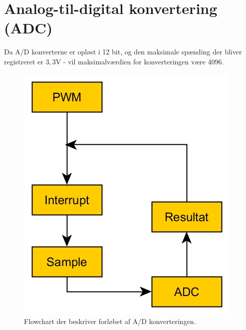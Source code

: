 \section{Analog-til-digital konvertering (ADC)}\label{sec:ADC}


Da A/D konverterne er opløst i 12 bit, og den maksimale spænding der bliver registreret er $3,3\si\volt$ - vil maksimalværdien for konverteringen være $4096$. 
\begin{figure}[h]
	\centering

		\includegraphics[width=.6\textwidth]{billeder/ADC.jpg}
			
	
	\caption{Flowchart der beskriver forløbet af A/D konverteringen.}
	\label{fig:ADC}
\end{figure}



